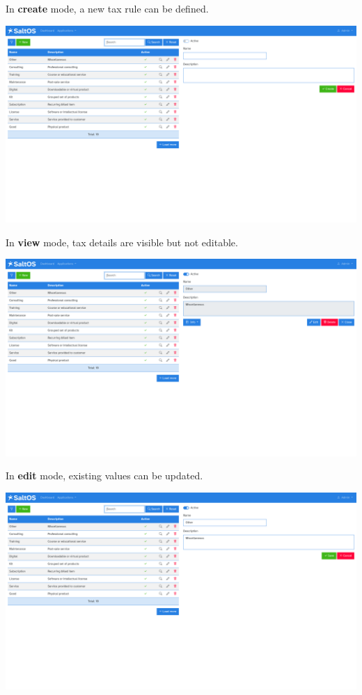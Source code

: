 \documentclass[a4paper]{article}
\begin{document}
In \textbf{create} mode, a new tax rule can be defined.

\begin{center}\includegraphics[width=1\textwidth]{../ujest/snaps/test-screenshots-js-screenshots-sales-products-types-create-en-us-1-snap.png}\end{center}

In \textbf{view} mode, tax details are visible but not editable.

\begin{center}\includegraphics[width=1\textwidth]{../ujest/snaps/test-screenshots-js-screenshots-sales-products-types-view-10-en-us-1-snap.png}\end{center}

In \textbf{edit} mode, existing values can be updated.

\begin{center}\includegraphics[width=1\textwidth]{../ujest/snaps/test-screenshots-js-screenshots-sales-products-types-edit-10-en-us-1-snap.png}\end{center}
\end{document}
